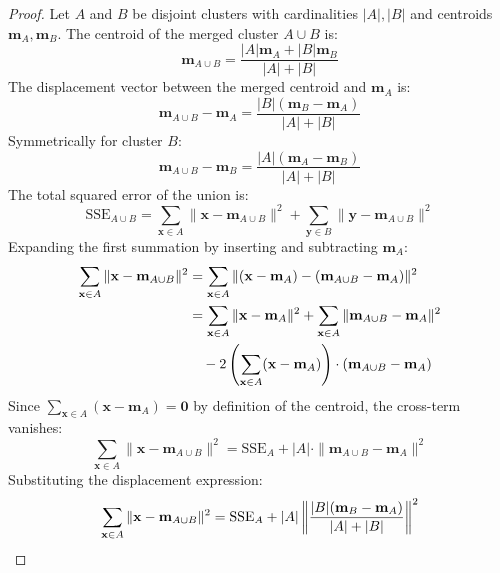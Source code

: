 \begin{proof}
Let $A$ and $B$ be disjoint clusters with cardinalities $|A|, |B|$ and centroids $\mathbf{m}_A, \mathbf{m}_B$. The centroid of the merged cluster $A \cup B$ is:
\begin{equation}
    \mathbf{m}_{A \cup B} = \frac{|A| \mathbf{m}_A + |B| \mathbf{m}_B}{|A| + |B|}
\end{equation}
The displacement vector between the merged centroid and $\mathbf{m}_A$ is:
\begin{equation}
    \mathbf{m}_{A \cup B} - \mathbf{m}_A = \frac{|B|(\mathbf{m}_B - \mathbf{m}_A)}{|A| + |B|}
\end{equation}
Symmetrically for cluster $B$:
\begin{equation}
    \mathbf{m}_{A \cup B} - \mathbf{m}_B = \frac{|A|(\mathbf{m}_A - \mathbf{m}_B)}{|A| + |B|}
\end{equation}
The total squared error of the union is:
\begin{equation}
    \mathrm{SSE}_{A \cup B} = \sum_{\mathbf{x} \in A} \|\mathbf{x} - \mathbf{m}_{A \cup B}\|^2 + \sum_{\mathbf{y} \in B} \|\mathbf{y} - \mathbf{m}_{A \cup B}\|^2
\end{equation}
Expanding the first summation by inserting and subtracting $\mathbf{m}_A$:
\begin{align}
    \sum_{\mathbf{x} \in A} \|\mathbf{x} - \mathbf{m}_{A \cup B}\|^2 &= \sum_{\mathbf{x} \in A} \|(\mathbf{x} - \mathbf{m}_A) - (\mathbf{m}_{A \cup B} - \mathbf{m}_A)\|^2 \notag \\
    &= \sum_{\mathbf{x} \in A} \|\mathbf{x} - \mathbf{m}_A\|^2 + \sum_{\mathbf{x} \in A} \|\mathbf{m}_{A \cup B} - \mathbf{m}_A\|^2 \notag \\
    &\quad - 2 \left( \sum_{\mathbf{x} \in A} (\mathbf{x} - \mathbf{m}_A) \right) \cdot (\mathbf{m}_{A \cup B} - \mathbf{m}_A)
\end{align}
Since $\sum_{\mathbf{x} \in A} (\mathbf{x} - \mathbf{m}_A) = \mathbf{0}$ by definition of the centroid, the cross-term vanishes:
\begin{equation}
    \sum_{\mathbf{x} \in A} \|\mathbf{x} - \mathbf{m}_{A \cup B}\|^2 = \mathrm{SSE}_A + |A| \cdot \|\mathbf{m}_{A \cup B} - \mathbf{m}_A\|^2
\end{equation}
Substituting the displacement expression:
\begin{align}
    \sum_{\mathbf{x} \in A} \|\mathbf{x} - \mathbf{m}_{A \cup B}\|^2 &= \mathrm{SSE}_A + |A| \left\| \frac{|B|(\mathbf{m}_B - \mathbf{m}_A)}{|A| + |B|} \right\|^2 \notag \\

\end{align}
\end{proof}
